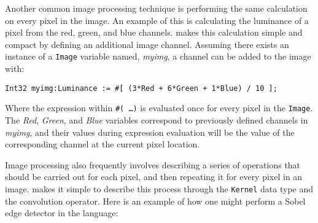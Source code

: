 Another common image processing technique is performing the same calculation
on every pixel in the image. An example of this is calculating the luminance
of a pixel from the red, green, and blue channels. \sys{} makes this calculation
simple and compact by defining an additional image channel. Assuming there exists
an instance of a \texttt{Image} variable named, \emph{myimg}, a channel can be
added to the image with:
\begin{lstlisting}[language=PLTF11]
    Int32 myimg:Luminance := #[ (3*Red + 6*Green + 1*Blue) / 10 ];
\end{lstlisting}
Where the expression within \texttt{\#( \ldots )} is evaluated once for every
pixel in the \texttt{Image}. The \emph{Red}, \emph{Green}, and \emph{Blue} variables
correspond to previously defined channels in \emph{myimg}, and their values during
expression evaluation will be the value of the corresponding channel at the current
pixel location.

Image processing also frequently involves describing a series of operations that
should be carried out for each pixel, and then repeating it for every pixel in an
image. \sys{} makes it simple to describe this process through the \texttt{Kernel}
data type and the convolution operator. Here is an example of how one might perform
a Sobel edge detector in the \sys{} language:

